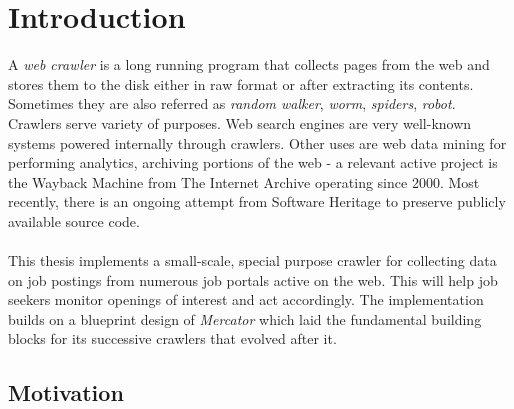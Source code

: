\chapter{Introduction}
A \textit{web crawler} is a long running program that collects pages from the web and stores them to the
disk either in raw format or after extracting its contents. Sometimes they are also referred as
\textit{random walker}, \textit{worm}, \textit{spiders}, \textit{robot}. Crawlers serve variety of
purposes. Web search engines are very well-known systems powered internally through crawlers.
Other uses are web data mining for performing analytics, archiving portions of the web - a
relevant active project is the Wayback Machine from The Internet Archive\cite{netarchive} operating since 2000. Most recently,
there is an ongoing attempt from Software Heritage\cite{swheritage} to preserve publicly available
source code.
\\
\\
This thesis implements a small-scale, special purpose crawler for collecting data on job postings from
numerous job portals active on the web. This will help job seekers monitor openings of interest and
act accordingly. The implementation builds on a blueprint design of \textit{Mercator} which laid the
fundamental building blocks for its successive crawlers that evolved after it.

\section{Motivation}



